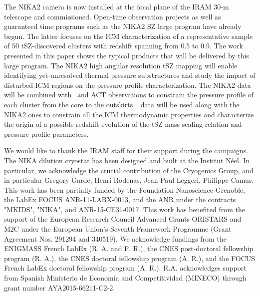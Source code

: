 \documentclass[traditabstract]{aa}
\begin{document}
The NIKA2 camera is now installed at the focal plane of the IRAM 30-m telescope and commissioned. Open-time observation projects as well as guaranteed time programs such as the NIKA2 SZ large program have already begun. The latter focuses on the ICM characterization of a representative sample of 50 tSZ-discovered clusters with redshift spanning from 0.5 to 0.9. The work presented in this paper shows the typical products that will be delivered by this large program. The NIKA2 high angular resolution tSZ mapping  will enable identifying yet-unresolved thermal pressure substructures and study the impact of disturbed ICM regions on the pressure profile characterization. The NIKA2 data will be combined with \planck\ and ACT observations to constrain the pressure profile of each cluster from the core to the outskirts. \xmm\ data will be used along with the NIKA2 ones to constrain all the ICM thermodynamic properties and characterize the origin of a possible redshift evolution of the tSZ-mass scaling relation and pressure profile parameters. 

\begin{acknowledgements}
We would like to thank the IRAM staff for their support during the campaigns. 
The NIKA dilution cryostat has been designed and built at the Institut N\'eel. 
In particular, we acknowledge the crucial contribution of the Cryogenics Group, and 
in particular Gregory Garde, Henri Rodenas, Jean Paul Leggeri, Philippe Camus. 
This work has been partially funded by the Foundation Nanoscience Grenoble, the LabEx FOCUS ANR-11-LABX-0013, and 
the ANR under the contracts "MKIDS", "NIKA", and ANR-15-CE31-0017. This work has benefited from the support of the European Research Council Advanced Grants ORISTARS and M2C under the European Union’s Seventh Framework Programme (Grant Agreement Nos. 291294 and 340519). We acknowledge fundings from the ENIGMASS French LabEx (R. A. and F. R.), 
the CNES post-doctoral fellowship program (R. A.),  the CNES doctoral fellowship program (A. R.), and 
the FOCUS French LabEx doctoral fellowship program (A. R.). R.A. acknowledges support from Spanish Ministerio de Econom\'ia and Competitividad (MINECO) through grant number AYA2015-66211-C2-2.
\end{acknowledgements}
\end{document}
